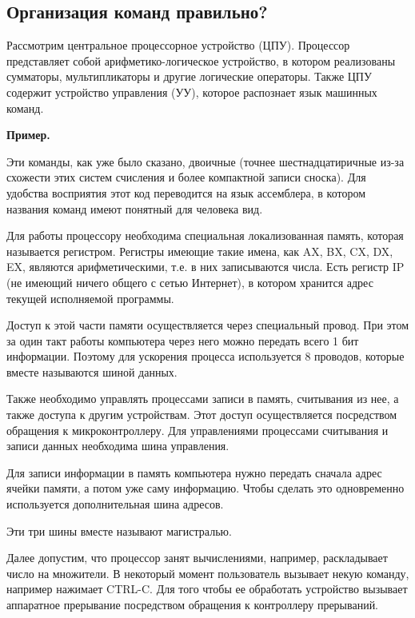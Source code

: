 \documentclass[a4paper, fleqn]{article}
\newenvironment{example}[1][]{\medskip \noindent \textbf{Пример. #1}\par \nopagebreak}{\medskip \par} %
\begin{document}
		\subsection*{Организация команд {\huge правильно?}}
		
			Рассмотрим центральное процессорное устройство (ЦПУ). Процессор представляет собой арифметико-логическое устройство, в котором реализованы сумматоры, мультипликаторы и другие логические операторы. Также ЦПУ содержит устройство управления (УУ), которое распознает язык машинных команд.
			
			\begin{example}
				Эти команды, как уже было сказано, двоичные (точнее шестнадцатиричные из-за схожести этих систем счисления и более компактной записи {\huge сноска}). Для удобства восприятия этот код переводится на язык ассемблера, в котором названия команд имеют понятный для человека вид.
			\end{example}
			
			Для работы процессору необходима специальная локализованная память, которая называется регистром. Регистры имеющие такие имена, как AX, BX, CX, DX, EX, являются арифметическими, т.е. в них записываются числа. Есть регистр IP (не имеющий ничего общего с сетью Интернет), в котором хранится адрес текущей исполняемой программы. 
			
			Доступ к этой части памяти осуществляется через специальный провод. При этом за один такт работы компьютера через него можно передать всего 1 бит информации. Поэтому для ускорения процесса используется 8 проводов, которые вместе называются шиной данных.
			
			Также необходимо управлять процессами записи в память, считывания из нее, а также доступа к другим устройствам. Этот доступ осуществляется посредством обращения к микроконтроллеру. Для управлениями процессами считывания и записи данных необходима шина управления. 
			
			Для записи информации в память компьютера нужно передать сначала адрес ячейки памяти, а потом уже саму информацию. Чтобы сделать это одновременно используется дополнительная шина адресов. 
			
			Эти три шины вместе называют магистралью. 
			
			Далее допустим, что процессор занят вычислениями, например, раскладывает число на множители. В некоторый момент пользователь вызывает некую команду, например нажимает CTRL-C. Для того чтобы ее обработать устройство вызывает аппаратное прерывание посредством обращения к контроллеру прерываний. 
			
\end{document}
